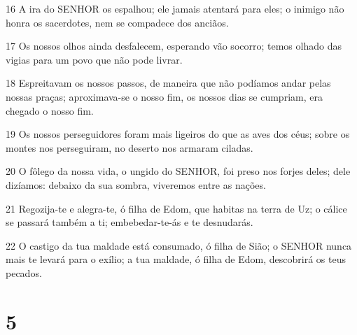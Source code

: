 \par 16 A ira do SENHOR os espalhou; ele jamais atentará para eles; o inimigo não honra os sacerdotes, nem se compadece dos anciãos.
\par 17 Os nossos olhos ainda desfalecem, esperando vão socorro; temos olhado das vigias para um povo que não pode livrar.
\par 18 Espreitavam os nossos passos, de maneira que não podíamos andar pelas nossas praças; aproximava-se o nosso fim, os nossos dias se cumpriam, era chegado o nosso fim.
\par 19 Os nossos perseguidores foram mais ligeiros do que as aves dos céus; sobre os montes nos perseguiram, no deserto nos armaram ciladas.
\par 20 O fôlego da nossa vida, o ungido do SENHOR, foi preso nos forjes deles; dele dizíamos: debaixo da sua sombra, viveremos entre as nações.
\par 21 Regozija-te e alegra-te, ó filha de Edom, que habitas na terra de Uz; o cálice se passará também a ti; embebedar-te-ás e te desnudarás.
\par 22 O castigo da tua maldade está consumado, ó filha de Sião; o SENHOR nunca mais te levará para o exílio; a tua maldade, ó filha de Edom, descobrirá os teus pecados.

\chapter{5}

